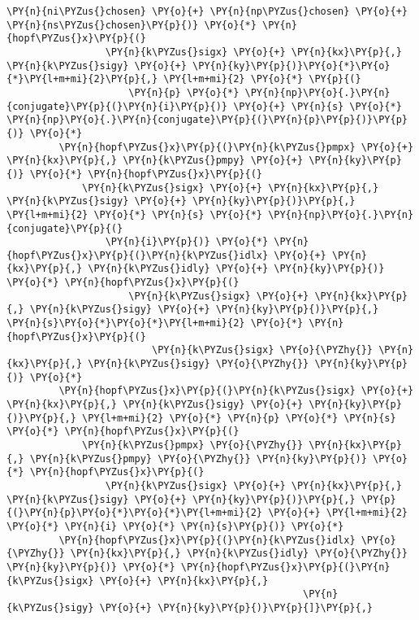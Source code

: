 \begin{Verbatim}[commandchars=\\\{\}]
             \PY{n}{ni\PYZus{}chosen} \PY{o}{+} \PY{n}{np\PYZus{}chosen} \PY{o}{+} \PY{n}{ns\PYZus{}chosen}\PY{p}{)} \PY{o}{*} \PY{n}{hopf\PYZus{}x}\PY{p}{(}
                 \PY{n}{k\PYZus{}sigx} \PY{o}{+} \PY{n}{kx}\PY{p}{,} \PY{n}{k\PYZus{}sigy} \PY{o}{+} \PY{n}{ky}\PY{p}{)}\PY{o}{*}\PY{o}{*}\PY{l+m+mi}{2}\PY{p}{,} \PY{l+m+mi}{2} \PY{o}{*} \PY{p}{(}
                     \PY{n}{p} \PY{o}{*} \PY{n}{np}\PY{o}{.}\PY{n}{conjugate}\PY{p}{(}\PY{n}{i}\PY{p}{)} \PY{o}{+} \PY{n}{s} \PY{o}{*} \PY{n}{np}\PY{o}{.}\PY{n}{conjugate}\PY{p}{(}\PY{n}{p}\PY{p}{)}\PY{p}{)} \PY{o}{*}
         \PY{n}{hopf\PYZus{}x}\PY{p}{(}\PY{n}{k\PYZus{}pmpx} \PY{o}{+} \PY{n}{kx}\PY{p}{,} \PY{n}{k\PYZus{}pmpy} \PY{o}{+} \PY{n}{ky}\PY{p}{)} \PY{o}{*} \PY{n}{hopf\PYZus{}x}\PY{p}{(}
             \PY{n}{k\PYZus{}sigx} \PY{o}{+} \PY{n}{kx}\PY{p}{,} \PY{n}{k\PYZus{}sigy} \PY{o}{+} \PY{n}{ky}\PY{p}{)}\PY{p}{,} \PY{l+m+mi}{2} \PY{o}{*} \PY{n}{s} \PY{o}{*} \PY{n}{np}\PY{o}{.}\PY{n}{conjugate}\PY{p}{(}
                 \PY{n}{i}\PY{p}{)} \PY{o}{*} \PY{n}{hopf\PYZus{}x}\PY{p}{(}\PY{n}{k\PYZus{}idlx} \PY{o}{+} \PY{n}{kx}\PY{p}{,} \PY{n}{k\PYZus{}idly} \PY{o}{+} \PY{n}{ky}\PY{p}{)} \PY{o}{*} \PY{n}{hopf\PYZus{}x}\PY{p}{(}
                     \PY{n}{k\PYZus{}sigx} \PY{o}{+} \PY{n}{kx}\PY{p}{,} \PY{n}{k\PYZus{}sigy} \PY{o}{+} \PY{n}{ky}\PY{p}{)}\PY{p}{,} \PY{n}{s}\PY{o}{*}\PY{o}{*}\PY{l+m+mi}{2} \PY{o}{*} \PY{n}{hopf\PYZus{}x}\PY{p}{(}
                         \PY{n}{k\PYZus{}sigx} \PY{o}{\PYZhy{}} \PY{n}{kx}\PY{p}{,} \PY{n}{k\PYZus{}sigy} \PY{o}{\PYZhy{}} \PY{n}{ky}\PY{p}{)} \PY{o}{*}
         \PY{n}{hopf\PYZus{}x}\PY{p}{(}\PY{n}{k\PYZus{}sigx} \PY{o}{+} \PY{n}{kx}\PY{p}{,} \PY{n}{k\PYZus{}sigy} \PY{o}{+} \PY{n}{ky}\PY{p}{)}\PY{p}{,} \PY{l+m+mi}{2} \PY{o}{*} \PY{n}{p} \PY{o}{*} \PY{n}{s} \PY{o}{*} \PY{n}{hopf\PYZus{}x}\PY{p}{(}
             \PY{n}{k\PYZus{}pmpx} \PY{o}{\PYZhy{}} \PY{n}{kx}\PY{p}{,} \PY{n}{k\PYZus{}pmpy} \PY{o}{\PYZhy{}} \PY{n}{ky}\PY{p}{)} \PY{o}{*} \PY{n}{hopf\PYZus{}x}\PY{p}{(}
                 \PY{n}{k\PYZus{}sigx} \PY{o}{+} \PY{n}{kx}\PY{p}{,} \PY{n}{k\PYZus{}sigy} \PY{o}{+} \PY{n}{ky}\PY{p}{)}\PY{p}{,} \PY{p}{(}\PY{n}{p}\PY{o}{*}\PY{o}{*}\PY{l+m+mi}{2} \PY{o}{+} \PY{l+m+mi}{2} \PY{o}{*} \PY{n}{i} \PY{o}{*} \PY{n}{s}\PY{p}{)} \PY{o}{*}
         \PY{n}{hopf\PYZus{}x}\PY{p}{(}\PY{n}{k\PYZus{}idlx} \PY{o}{\PYZhy{}} \PY{n}{kx}\PY{p}{,} \PY{n}{k\PYZus{}idly} \PY{o}{\PYZhy{}} \PY{n}{ky}\PY{p}{)} \PY{o}{*} \PY{n}{hopf\PYZus{}x}\PY{p}{(}\PY{n}{k\PYZus{}sigx} \PY{o}{+} \PY{n}{kx}\PY{p}{,}
                                                   \PY{n}{k\PYZus{}sigy} \PY{o}{+} \PY{n}{ky}\PY{p}{)}\PY{p}{]}\PY{p}{,}

\end{Verbatim}
